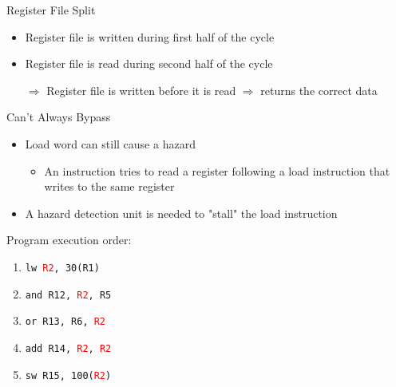 \documentclass[aspectratio=169,12pt]{beamer}
\begin{document}
\begin{frame}{Register File Split}
    \begin{itemize}
        \item Register file is written during first half of the cycle
        \item Register file is read during second half of the cycle
        \item[$\Rightarrow$] Register file is written before it is read $\Rightarrow$ returns the correct data
    \end{itemize}
    
    \centering
\end{frame}

\begin{frame}{Can't Always Bypass}
    \begin{itemize}
        \item Load word can still cause a hazard
        \begin{itemize}
            \item An instruction tries to read a register following a load instruction that writes to the same register
        \end{itemize}
        \item A hazard detection unit is needed to "stall" the load instruction
    \end{itemize}
    
    Program execution order:
    \begin{enumerate}
        \item \texttt{lw \textcolor{red}{R2}, 30(R1)}
        \item \texttt{and R12, \textcolor{red}{R2}, R5}
        \item \texttt{or R13, R6, \textcolor{red}{R2}}
        \item \texttt{add R14, \textcolor{red}{R2}, \textcolor{red}{R2}}
        \item \texttt{sw R15, 100(\textcolor{red}{R2})}
    \end{enumerate}
\end{frame}
\end{document}
